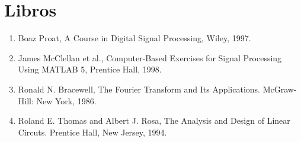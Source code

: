 \section{Libros}
\begin{enumerate}

\item Boaz Proat, 
  A Course in Digital Signal Processing, 
  Wiley, 1997. 

\item James McClellan et al., 
  Computer-Based Exercises for Signal Processing Using MATLAB 5,
  Prentice Hall, 1998.

\item Ronald N. Bracewell, 
  The Fourier Transform and Its Applications. 
  McGraw-Hill: New York, 1986.

\item Roland E. Thomas and Albert J. Rosa, 
  The Analysis and Design of Linear Circuts.
  Prentice Hall, New Jersey, 1994.

\end{enumerate}
